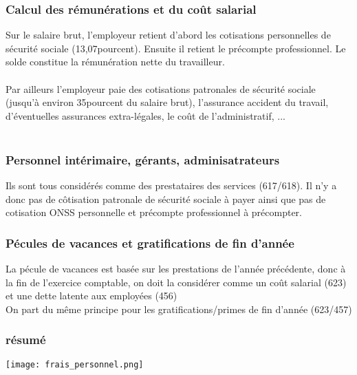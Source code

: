 \documentclass{article}
\begin{document}
\subsubsection*{Calcul des rémunérations et du coût salarial}
Sur le salaire brut, l'employeur retient d'abord les cotisations personnelles de sécurité sociale (13,07pourcent). Ensuite il retient le précompte professionnel. Le solde constitue la rémunération nette du travailleur. \\
\\
Par ailleurs l'employeur paie des cotisations patronales de sécurité sociale (jusqu'à environ 35pourcent du salaire brut), l'assurance accident du travail, d'éventuelles assurances extra-légales, le coût de l'administratif, ...
\\ \\
\subsubsection*{Personnel intérimaire, gérants, adminisatrateurs}
Ils sont tous considérés comme des prestataires des services (617/618). Il n'y a donc pas de côtisation patronale de sécurité sociale à payer ainsi que pas de cotisation ONSS personnelle et précompte professionnel à précompter. 
 
\subsubsection*{Pécules de vacances et gratifications de fin d'année}
La pécule de vacances est basée sur les prestations de l'année précédente, donc à la fin de l'exercice comptable, on doit la considérer comme un coût salarial (623) et une dette latente aux employées (456)\\
On part du même principe pour les gratifications/primes de fin d'année (623/457)

\subsubsection*{résumé}
\begin{center}
    \texttt{[image: frais\_personnel.png]}
\end{center}
\end{document}
